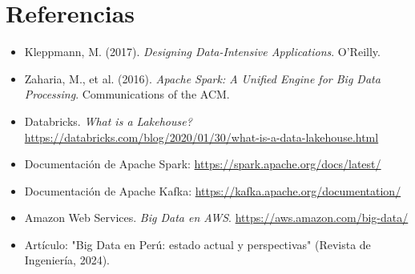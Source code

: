 \documentclass[12pt,a4paper,openany,oneside]{book}
\begin{document}
\chapter*{Referencias}
\begin{itemize}
    \item Kleppmann, M. (2017). \textit{Designing Data-Intensive Applications}. O'Reilly.
    \item Zaharia, M., et al. (2016). \textit{Apache Spark: A Unified Engine for Big Data Processing}. Communications of the ACM.
    \item Databricks. \textit{What is a Lakehouse?} \url{https://databricks.com/blog/2020/01/30/what-is-a-data-lakehouse.html}
    \item Documentación de Apache Spark: \url{https://spark.apache.org/docs/latest/}
    \item Documentación de Apache Kafka: \url{https://kafka.apache.org/documentation/}
    \item Amazon Web Services. \textit{Big Data en AWS}. \url{https://aws.amazon.com/big-data/}
    \item Artículo: "Big Data en Perú: estado actual y perspectivas" (Revista de Ingeniería, 2024).
\end{itemize}
\end{document}
